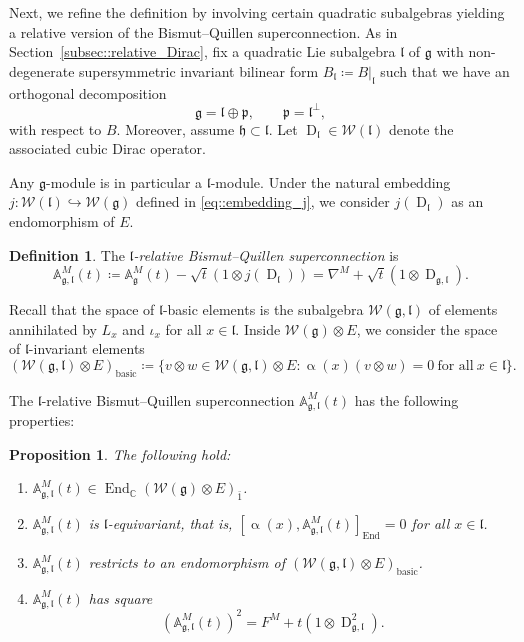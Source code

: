 \documentclass[11pt]{amsart}
\newcommand{\End}{\operatorname{End}}
\newcommand{\Dirac}{\operatorname{D}}
\def\WW{{\mathcal{W}}}
\def\pp{{\mathfrak p}}
\def\ll{{\mathfrak l}}
\def \AA {{\mathbb{A}}}
\def\pp{{\mathfrak p}}
\def\pp{{\mathfrak{p}}}
\def\gg{{\mathfrak{g}}}
\theoremstyle{plain}
\newtheorem{proposition}[theorem]{Proposition}
\theoremstyle{remark}
\theoremstyle{definition}
\newtheorem{definition}[theorem]{Definition}
\numberwithin{equation}{section}
\theoremstyle{remark}
\begin{document}
Next, we refine the definition by involving certain quadratic subalgebras yielding a relative version of the Bismut--Quillen superconnection. As in Section~\ref{subsec::relative_Dirac}, fix a quadratic Lie subalgebra $\ll$ of $\gg$ with non-degenerate supersymmetric invariant bilinear form $B_{\ll}\coloneqq B|_{\ll}$ such that we have an orthogonal decomposition
\begin{equation}
\gg=\ll\oplus\pp,\qquad \pp=\ll^{\perp},
\end{equation}
with respect to $B$. Moreover, assume $\mathfrak{h} \subset \ll$. Let $\Dirac_{\ll} \in \WW(\ll)$ denote the associated cubic Dirac operator.

Any $\gg$-module is in particular a $\ll$-module. Under the natural embedding $j : \mathcal{W}(\ll)\hookrightarrow \mathcal{W}(\gg)$ defined in \eqref{eq::embedding_j}, we consider $j(\Dirac_{\ll})$ as an endomorphism of $E$. 

\begin{definition}
 The $\ll$\emph{-relative Bismut--Quillen superconnection} is 
 \[
 \mathbb{A}_{\gg,\ll}^{M}(t)\coloneqq \mathbb{A}_{\gg}^{\!M}(t)-\sqrt{t}(1\otimes j(\Dirac_{\ll}))=\nabla^{M} + \sqrt{t}(1\otimes \Dirac_{\gg,\ll}).
 \]
\end{definition}

Recall that the space of $\ll$-basic elements is the subalgebra $\mathcal{W}(\gg,\ll)$ of elements annihilated by $L_{x}$ and $\iota_{x}$ for all $x \in \ll$. Inside $\mathcal{W}(\gg)\otimes E$, we consider the space of $\ll$-invariant elements
\begin{equation} 
 (\mathcal{W}(\gg,\ll)\otimes E)_{\text{basic}}\coloneqq \{ v \otimes w \in \mathcal{W}(\gg,\ll)\otimes E : \upalpha(x)(v\otimes w)=0 \ \text{for all} \ x \in \ll\}.
\end{equation}

The $\ll$-relative Bismut--Quillen superconnection $\mathbb{A}^{\!M}_{\gg,\ll}(t)$ has the following properties:

\begin{proposition} \label{prop::properties_relative} The following hold:
\begin{enumerate}
\item[a)] $\mathbb{A}^{\!M}_{\gg,\ll}(t) \in \End_{\mathbb{C}}(\mathcal{W}(\gg)\otimes E)_{\bar{1}}$.
 \item[b)] $\mathbb{A}^{\!M}_{\gg,\ll}(t)$ is $\ll$-equivariant, that is, $[\upalpha(x), \mathbb{A}^{\!M}_{\gg,\ll}(t)]_{\End}=0$ for all $x \in \ll$. 
 \item[c)] $\AA^{\!M}_{\gg,\ll}(t)$ restricts to an endomorphism of $(\WW(\gg,\ll) \otimes E)_{\text{basic}}$.
\item[d)] $\mathbb{A}^{\!M}_{\gg,\ll}(t)$ has square 
 \[ (\mathbb{A}^{\!M}_{\gg,\ll}(t))^{2}=F^{M} +t (1\otimes \Dirac_{\gg,\ll}^{2}).
 \]
\end{enumerate}
\end{proposition}
\end{document}
